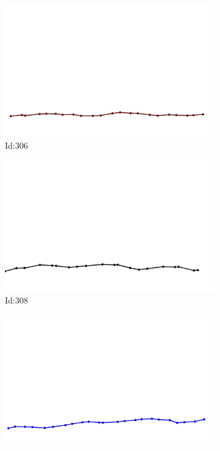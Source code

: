 \documentclass[12pt,twoside]{report}
\begin{document}
\begin{figure}
\centering
\begin{subfigure}[b]{0.20\textwidth}
\centering
\includegraphics[width=\textwidth]{../../trajectories/306.png}
\caption{Id:306}
\end{subfigure}
\begin{subfigure}[b]{0.20\textwidth}
\centering
\includegraphics[width=\textwidth]{../../trajectories/308.png}
\caption{Id:308}
\end{subfigure}
\begin{subfigure}[b]{0.20\textwidth}
\centering
\includegraphics[width=\textwidth]{../../trajectories/375.png}

\end{subfigure}
\end{figure}
\end{document}
